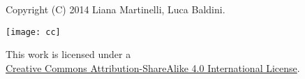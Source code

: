 \vspace*{0.8\textheight}


\begin{center}
  Copyright (C) 2014 Liana Martinelli, Luca Baldini.

  \medskip
  
  \texttt{[image: cc]}

  \medskip
  
  \noindent This work is licensed under a\\
  \href{http://creativecommons.org/licenses/by-sa/4.0/}%
  {Creative Commons Attribution-ShareAlike 4.0 International License}.

\end{center}
